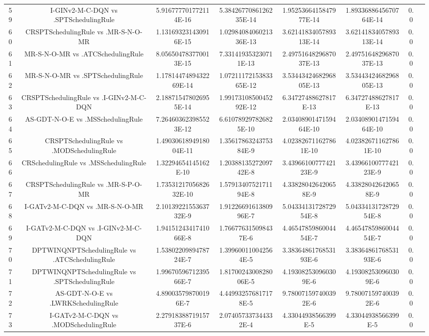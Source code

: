 \documentclass[a3paper,10pt]{article}
\begin{document}
\begin{table}[!htp]
\begin{tabular}{cccccccc}
59&I-GINv2-M-C-DQN vs .SPTSchedulingRule&5.916777701772114E-16&5.3842677086126235E-14&1.9525366415847977E-14&1.8933688645670764E-14&0.0\\
60&CRSPTSchedulingRule vs .MR-S-N-O-MR&1.131693231430916E-15&1.0298408406021336E-13&3.6214183405789313E-14&3.6214183405789313E-14&0.0\\
61&MR-S-N-O-MR vs .ATCSchedulingRule&8.056504783770013E-15&7.331419353230711E-13&2.4975164829687037E-13&2.4975164829687037E-13&0.0\\
62&MR-S-N-O-MR vs .SPTSchedulingRule&1.1781447489432269E-14&1.0721117215383365E-12&3.5344342468296805E-13&3.5344342468296805E-13&0.0\\
63&CRSPTSchedulingRule vs .I-GINv2-M-C-DQN&2.188715478026955E-14&1.9917310850045292E-12&6.34727488627817E-13&6.34727488627817E-13&0.0\\
64&AS-GDT-N-O-E vs .MSSchedulingRule&7.264603623985523E-12&6.610789297826825E-10&2.0340890147159464E-10&2.0340890147159464E-10&0.0\\
65&CRSPTSchedulingRule vs .MODSchedulingRule&1.4903061894918004E-11&1.3561786324375384E-9&4.023826711627861E-10&4.023826711627861E-10&0.0\\
66&CRSchedulingRule vs .MSSchedulingRule&1.32294654145162E-10&1.2038813527209742E-8&3.4396610077742123E-9&3.4396610077742123E-9&0.0\\
67&CRSPTSchedulingRule vs .MR-S-P-O-MR&1.7353121705682632E-10&1.5791340752171194E-8&4.338280426420658E-9&4.338280426420658E-9&0.0\\
68&I-GATv2-M-C-DQN vs .MR-S-N-O-MR&2.1013922155363732E-9&1.9122669161380996E-7&5.0433413172872954E-8&5.0433413172872954E-8&0.0\\
69&I-GATv2-M-C-DQN vs .I-GINv2-M-C-DQN&1.9415124341741066E-8&1.766776315098437E-6&4.4654785986004454E-7&4.4654785986004454E-7&0.0\\
70&DPTWINQNPTSchedulingRule vs .ATCSchedulingRule&1.5380220989478724E-7&1.399600110042564E-5&3.3836486176853193E-6&3.3836486176853193E-6&0.0\\
71&DPTWINQNPTSchedulingRule vs .SPTSchedulingRule&1.9967059671239566E-7&1.8170024300828006E-5&4.193082530960309E-6&4.193082530960309E-6&0.0\\
72&AS-GDT-N-O-E vs .LWRKSchedulingRule&4.890035798700196E-7&4.449932576817178E-5&9.780071597400392E-6&9.780071597400392E-6&0.0\\
73&I-GATv2-M-C-DQN vs .MODSchedulingRule&2.2791838871915737E-6&2.074057337344332E-4&4.33044938566399E-5&4.33044938566399E-5&0.0\\

\end{tabular}
\end{table}
\end{document}
